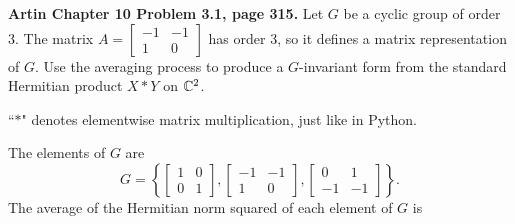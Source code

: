 \documentclass{article}
\begin{document}
\bigskip
\begin{prob}
    \textbf{Artin Chapter 10 Problem 3.1, page 315.} Let $G$ be a cyclic group of order 3. The matrix $A= \begin{bmatrix}
        -1 & -1 \\
        1 & 0
    \end{bmatrix}$ has order 3, so it defines a matrix representation of $G$. Use the averaging process to produce a $G$-invariant form from the standard Hermitian product $X * Y$ on $\mathbb{C}^2$.
\end{prob}
\begin{note}
    ``$*$" denotes elementwise matrix multiplication, just like in Python.
\end{note}
The elements of $G$ are
\[ G = \left\{ \begin{bmatrix}
        1 & 0 \\
        0 & 1
\end{bmatrix}, \begin{bmatrix}
        -1 & -1 \\
        1 & 0
\end{bmatrix}, \begin{bmatrix}
        0 & 1 \\
        -1 & -1
\end{bmatrix} \right\}. \]
The average of the Hermitian norm squared of each element of $G$ is
\end{document}
